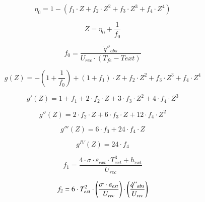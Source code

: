 \begin{equation}
    \eta_{0} = 1 - (f_{1} \cdot Z + f_{2} \cdot Z^{2} + f_{3} \cdot Z^{3} + f_{4} \cdot Z^{4})
    \label{eq:rendimiento0}
\end{equation}

\begin{equation}
    Z = \eta_{0} + \frac{1}{f_{0}} 
    \label{eq:zeta}
\end{equation}

\begin{equation}
    f_0 = \frac{\dot{q}''_{abs}}{U_{rec} \cdot (T_{fe}-T{ext})}
    \label{eq:f0}
\end{equation}

\begin{equation}
    g(Z) = -\left(1+\frac{1}{f_{0}}\right)+(1+f_{1})\cdot Z + f_{2}\cdot Z^{2} +  f_{3}\cdot Z^{3} + f_{4}\cdot Z^{4} 
    \label{eq:gdezeta}
\end{equation}

\begin{equation}
    g'(Z) = 1 + f_{1} + 2 \cdot f_{2} \cdot Z + 3 \cdot f_{3} \cdot Z^{2} + 4 \cdot f_{4} \cdot Z^{3} 
    \label{eq:gprimadezeta}
\end{equation}

\begin{equation}
    g''(Z) = 2 \cdot f_{2} \cdot Z + 6 \cdot f_{3} \cdot Z + 12 \cdot f_{4} \cdot Z^{2} 
    \label{eq:g2primadezeta}
\end{equation}

\begin{equation}
    g'''(Z) = 6 \cdot f_{3} + 24 \cdot f_{4} \cdot Z
    \label{eq:g3primadezeta}
\end{equation}

\begin{equation}
    g^{IV}(Z) = 24 \cdot f_{4}
    \label{eq:g4primadezeta}
\end{equation}

\begin{equation}
    f_{1} = \frac{4 \cdot \sigma \cdot \varepsilon_{ext} \cdot T_{ext}^{3} + h_{ext}}{U_{rec}}
    \label{eq:f1}
\end{equation}

\begin{equation}
    f_{2} = 6 \cdot T_{ext}^{2} \cdot \left(\frac{\sigma \cdot \varepsilon_{ext}}{U_{rec}} \right) \cdot \left(\frac{\dot{q}"_{abs}}{U_{rec}}\right) 
    \label{eq:f2}
\end{equation}


